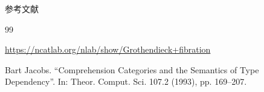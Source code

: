 \documentclass{beamer}
\begin{document}
\begin{frame}[allowframebreaks]{参考文献}
\begin{thebibliography}{99}

\url{https://ncatlab.org/nlab/show/Grothendieck+fibration}

Bart Jacobs. “Comprehension Categories and the Semantics of Type Dependency”. In: Theor. Comput. Sci. 107.2 (1993), pp. 169–207.

\end{thebibliography}
\end{frame}
\end{document}
